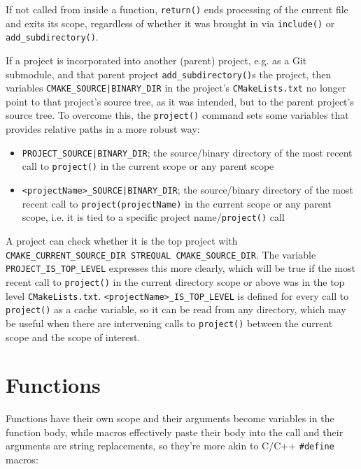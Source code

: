 \documentclass[table, xcdraw]{article}%
\begin{document}
If not called from inside a function, \texttt{return()} ends processing of the current file and exits its scope, regardless of whether it was brought in via \texttt{include()} or \texttt{add_subdirectory()}.

If a project is incorporated into another (parent) project, e.g. as a Git submodule, and that parent project \texttt{add_subdirectory()}s the project, then variables \texttt{CMAKE_SOURCE|BINARY_DIR} in the project's \texttt{CMakeLists.txt} no longer point to that project's source tree, as it was intended, but to the parent project's source tree. To overcome this, the \texttt{project()} command sets some variables that provides relative paths in a more robust way:

\begin{itemize}
    \item \texttt{PROJECT_SOURCE|BINARY_DIR}; the source/binary directory of the most recent call to \texttt{project()} in the current scope or any parent scope
    \item \texttt{<projectName>_SOURCE|BINARY_DIR}; the source/binary directory of the most recent call to \texttt{project(projectName)} in the current scope or any parent scope, i.e. it is tied to a specific project name/\texttt{project()} call
\end{itemize}

A project can check whether it is the top project with \texttt{CMAKE_CURRENT_SOURCE_DIR STREQUAL CMAKE_SOURCE_DIR}. The variable \texttt{PROJECT_IS_TOP_LEVEL} expresses this more clearly, which will be true if the most recent call to \texttt{project()} in the current directory scope or above was in the top level \texttt{CMakeLists.txt}. \texttt{<projectName>_IS_TOP_LEVEL} is defined for every call to \texttt{project()} as a cache variable, so it can be read from any directory, which may be useful when there are intervening calls to \texttt{project()} between the current scope and the scope of interest.

\section{Functions}

Functions have their own scope and their arguments become variables in the function body, while macros effectively paste their body into the call and their arguments are string replacements, so they're more akin to C/C++ \texttt{#define} macros:
\end{document}
